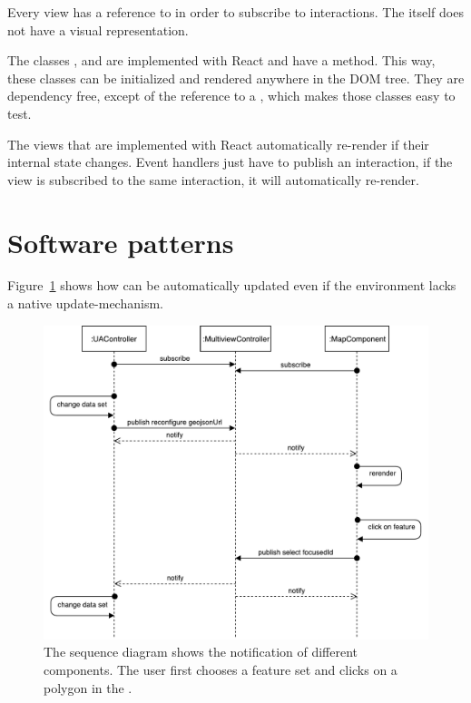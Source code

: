 Every view has a reference to  in order to subscribe to interactions.
The  itself does not have a visual representation.

The classes ,  and  are implemented with React and have a  method.
This way, these classes can be initialized and rendered anywhere in the DOM tree.
They are dependency free, except of the reference to a , which makes those classes easy to test.

The views that are implemented with React automatically re-render if their internal state changes.
Event handlers just have to publish an interaction, if the view is subscribed to the same interaction, it will automatically re-render.

\section{Software patterns}\label{sec:implementation:patterns}
Figure~\ref{fig:implementation:sequence-diagram} shows how \cmvs{} can be automatically updated even if the environment lacks a native update-mechanism.

\begin{figure}[ht]
  \centering
  \includegraphics[width=\textwidth]{figures/implementation/SequenceDiagram}
  \caption{%
    The sequence diagram shows the notification of different components.
  The user first chooses a feature set and clicks on a polygon in the \gv{}.
  }\label{fig:implementation:sequence-diagram}
\end{figure}


